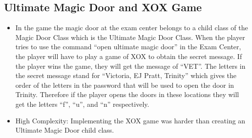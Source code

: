 \documentclass[11pt]{article}
\begin{document}
\begin{enumerate}
\subsection*{Ultimate Magic Door and XOX Game}
\begin{itemize}
    \item In the game the magic door at the exam center belongs to a child class of the Magic Door Class which is the Ultimate Magic Door Class. When the player tries to use the command “open ultimate magic door” in the Exam Center, the player will have to play a game of XOX to obtain the secret message. If the player wins the game, they will get the message of “VET”. The letters in the secret message stand for “Victoria, EJ Pratt, Trinity” which gives the order of the letters in the password that will be used to open the door in Trinity. Therefore if the player opens the doors in these locations they will get the letters “f”, “u”, and “n” respectively.
    \item High Complexity: Implementing the XOX game was harder than creating an Ultimate Magic Door child class.
\end{itemize}

\end{enumerate}
\end{document}
